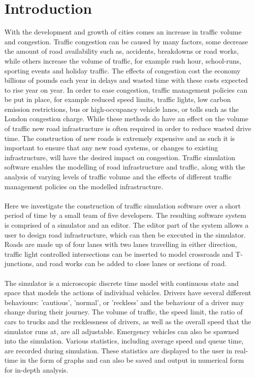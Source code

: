 \section{Introduction}
With the development and growth of cities comes an increase in traffic volume and congestion. Traffic congestion can be caused by many factors, some decrease the amount of road availability such as, accidents, breakdowns or road works, while others increase the volume of traffic, for example rush hour, school-runs, sporting events and holiday traffic. The effects of congestion cost the economy billions of pounds each year in delays and wasted time \cite{arnott1994economics,FinancialTimes} with these costs expected to rise year on year. In order to ease congestion, traffic management policies can be put in place, for example reduced speed limits, traffic lights, low carbon emission restrictions, bus or high-occupancy vehicle lanes, or tolls such as the London congestion charge. While these methods do have an effect on the volume of traffic \cite{TFLImpacts} new road infrastructure is often required in order to reduce wasted drive time.
The construction of new roads is extremely expensive \cite{BBC} and as such it is important to ensure that any new road systems, or changes to existing infrastructure, will have the desired impact on congestion. Traffic simulation software enables the modelling of road infrastructure and traffic, along with the analysis of varying levels of traffic volume and the effects of different traffic management policies on the modelled infrastructure.

\paragraph{}
Here we investigate the construction of traffic simulation software over a short period of time by a small team of five developers.
The resulting software system is comprised of a simulator and an editor. The editor part of the system allows a user to design road infrastructure, which can then be executed in the simulator. Roads are made up of four lanes with two lanes travelling in either direction, traffic light controlled intersections can be inserted to model crossroads and T-junctions, and road works can be added to close lanes or sections of road.

\paragraph{}
The simulator is a microscopic discrete time model with continuous state and space that models the actions of individual vehicles. Drivers have several different behaviours: 'cautious', 'normal', or 'reckless' and the behaviour of a driver may change during their journey. The volume of traffic, the speed limit, the ratio of cars to trucks and the recklessness of drivers, as well as the overall speed that the simulator runs at, are all adjustable. Emergency vehicles can also be spawned into the simulation. Various statistics, including average speed and queue time, are recorded during simulation. These statistics are displayed to the user in real-time in the form of graphs and can also be saved and output in numerical form for in-depth analysis.